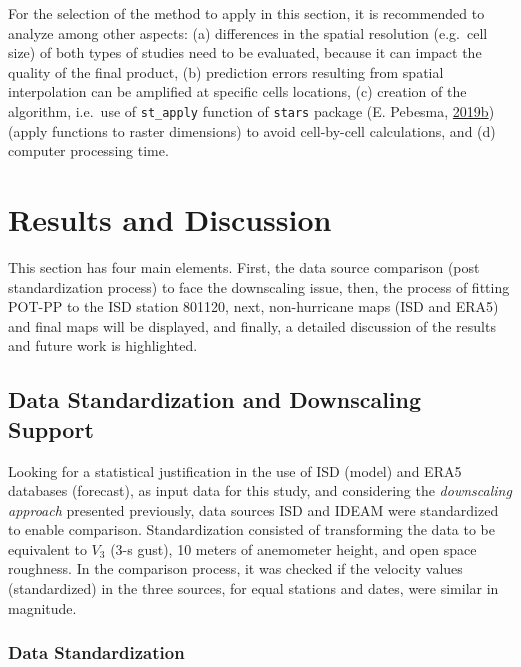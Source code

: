 \documentclass[12pt,oneside]{reedthesis}
\begin{document}
For the selection of the method to apply in this section, it is recommended to analyze among other aspects: (a) differences in the spatial resolution (e.g.~cell size) of both types of studies need to be evaluated, because it can impact the quality of the final product, (b) prediction errors resulting from spatial interpolation can be amplified at specific cells locations, (c) creation of the algorithm, i.e.~use of \texttt{st\_apply} function of \texttt{stars} package (E. Pebesma, \protect\hyperlink{ref-Pebesma2019b}{2019}\protect\hyperlink{ref-Pebesma2019b}{b}) (apply functions to raster dimensions) to avoid cell-by-cell calculations, and (d) computer processing time.

\hypertarget{rmd-results}{%
\chapter{Results and Discussion}\label{rmd-results}}

This section has four main elements. First, the data source comparison (post standardization process) to face the downscaling issue, then, the process of fitting POT-PP to the ISD station 801120, next, non-hurricane maps (ISD and ERA5) and final maps will be displayed, and finally, a detailed discussion of the results and future work is highlighted.

\hypertarget{data-standardization-and-downscaling-support}{%
\section{Data Standardization and Downscaling Support}\label{data-standardization-and-downscaling-support}}

Looking for a statistical justification in the use of ISD (model) and ERA5 databases (forecast), as input data for this study, and considering the \emph{downscaling approach} presented previously, data sources ISD and IDEAM were standardized to enable comparison. Standardization consisted of transforming the data to be equivalent to \(V_3\) (3-s gust), 10 meters of anemometer height, and open space roughness. In the comparison process, it was checked if the velocity values (standardized) in the three sources, for equal stations and dates, were similar in magnitude.

\hypertarget{data-standardization}{%
\subsection{Data Standardization}\label{data-standardization}}
\end{document}
